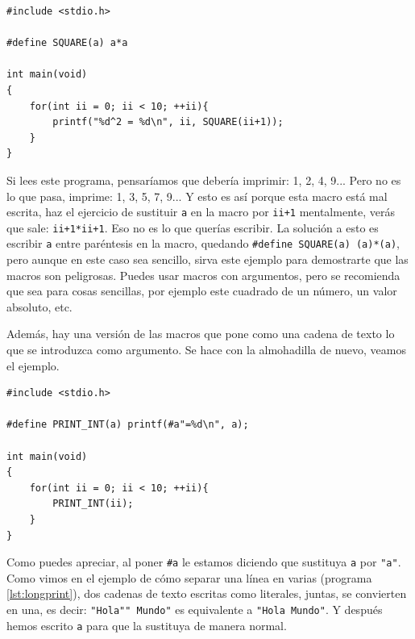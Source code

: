 \documentclass[a4paper]{article}
\begin{document}
\noindent
\begin{minipage}[H]{\linewidth}
\mbox{}
\begin{lstlisting}[style=C,
caption={Ejemplo de error por una macro},
label={lst:macroError}]
#include <stdio.h>

#define SQUARE(a) a*a

int main(void)
{
    for(int ii = 0; ii < 10; ++ii){
        printf("%d^2 = %d\n", ii, SQUARE(ii+1));
    }
}
\end{lstlisting}
\end{minipage}

Si lees este programa, pensaríamos que debería imprimir: 1, 2, 4, 9... Pero
no es lo que pasa, imprime: 1, 3, 5, 7, 9... Y esto es así porque esta macro
está mal escrita, haz el ejercicio de sustituir \verb!a! en la macro por
\verb!ii+1! mentalmente, verás que sale: \verb!ii+1*ii+1!. Eso no es lo que
querías escribir. La solución a esto es escribir \verb!a! entre paréntesis en la
macro, quedando \verb!#define SQUARE(a) (a)*(a)!, pero aunque en este caso sea
sencillo, sirva este ejemplo para demostrarte que las macros son peligrosas.
Puedes usar macros con argumentos, pero se recomienda que sea para cosas
sencillas, por ejemplo este cuadrado de un número, un valor absoluto, etc.

Además, hay una versión de las macros que pone como una cadena de texto
lo que se introduzca como argumento. Se hace con la almohadilla de nuevo,
veamos el ejemplo.

\noindent
\begin{minipage}[H]{\linewidth}
\mbox{}
\begin{lstlisting}[style=C,
caption={Uso de macros con cadenas de texto},
label={lst:macroText}]
#include <stdio.h>

#define PRINT_INT(a) printf(#a"=%d\n", a);

int main(void)
{
    for(int ii = 0; ii < 10; ++ii){
        PRINT_INT(ii);
    }
}
\end{lstlisting}
\end{minipage}

Como puedes apreciar, al poner \verb!#a! le estamos diciendo que sustituya
\verb!a! por \verb!"a"!. Como vimos en el ejemplo de cómo separar una línea en
varias (programa \ref{lst:longprint}), dos cadenas de texto escritas
como literales, juntas, se convierten en una, es decir: \verb!"Hola"" Mundo"!
es equivalente a \verb!"Hola Mundo"!. Y después hemos escrito \verb!a! para que
la sustituya de manera normal.
\end{document}
